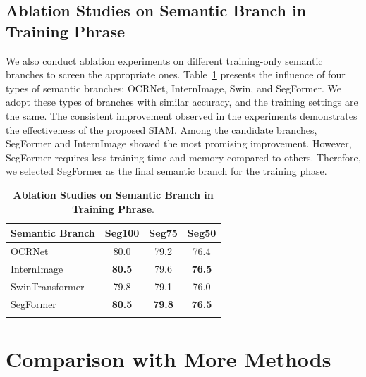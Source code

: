 \documentclass[letterpaper]{article} %
\begin{document}
\subsection{Ablation Studies on Semantic Branch in Training Phrase} 
We also conduct ablation experiments on different training-only semantic branches to screen the appropriate ones. Table~\ref{supptab:Semantic Branch Ablation} presents the influence of four types of semantic branches: OCRNet, InternImage, Swin, and SegFormer. We adopt these types of branches with similar accuracy, and the training settings are the same. The consistent improvement observed in the experiments demonstrates the effectiveness of the proposed SIAM. Among the candidate branches, SegFormer and InternImage showed the most promising improvement. However, SegFormer requires less training time and memory compared to others. Therefore, we selected SegFormer as the final semantic branch for the training phase.

\begin{table}
	\centering
        \caption{\textbf{Ablation Studies on Semantic Branch in Training Phrase}.
        }
        \setlength{\tabcolsep}{1mm}
        \centering
        \begin{tabular}{l|c|c|c}
        \Xhline{1pt}
            Semantic Branch
            &Seg100
            &Seg75
            &Seg50 \\
            \hline
            OCRNet     &80.0 &79.2 &76.4\\
            InternImage  &\textbf{80.5} &79.6 &\textbf{76.5}\\
            SwinTransformer  &79.8 &79.1 &76.0\\
            SegFormer &\textbf{80.5} &\textbf{79.8} &\textbf{76.5}\\
        \Xhline{1pt}
        \end{tabular}
		\label{supptab:Semantic Branch Ablation}
\end{table}


\section{Comparison with More Methods}\label{section:C}
\end{document}
